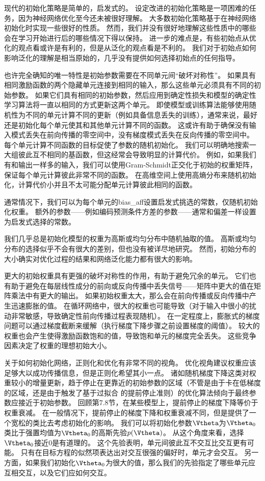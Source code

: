 
现代的初始化策略是简单的，启发式的。
设定改进的初始化策略是一项困难的任务，因为神经网络优化至今还未被很好理解。
大多数初始化策略基于在神经网络初始化时实现一些很好的性质。
然而，我们并没有很好地理解这些性质中的哪些会在学习开始进行后的哪些情况下得以保持。
进一步的难点是，有些初始点从优化的观点看或许是有利的，但是从泛化的观点看是不利的。
我们对于初始点如何影响泛化的理解是相当原始的，几乎没有提供如何选择初始点的任何指导。

也许完全确知的唯一特性是初始参数需要在不同单元间“破坏对称性”。
如果具有相同激励函数的两个隐藏单元连接到相同的输入，那么这些单元必须具有不同的初始参数。
如果它们具有相同的初始参数，然后应用到确定性损失和模型的确定性学习算法将一直以相同的方式更新这两个单元。
即使模型或训练算法能够使用随机性为不同的单元计算不同的更新（例如具备信息丢失的训练），通常来说，最好还是初始化每个单元使其和其他单元计算不同的函数。
这或许有助于确保没有输入模式丢失在前向传播的零空间中，没有梯度模式丢失在反向传播的零空间中。
每个单元计算不同函数的目标促使了参数的随机初始化。
我们可以明确地搜索一大组彼此互不相同的基函数，但这经常会导致明显的计算代价。  
例如，如果我们有和输出一样多的输入，我们可以使用Gram-Schmidt正交化于初始的权重矩阵，保证每个单元计算彼此非常不同的函数。
在高维空间上使用高熵分布来随机初始化，计算代价小并且不太可能分配单元计算彼此相同的函数。

通常情况下，我们可以为每个单元的\gls{bias_aff}设置启发式挑选的常数，仅随机初始化权重。
额外的参数——例如编码预测条件方差的参数——通常和偏差一样设置为启发式选择的常数。

我们几乎总是初始化模型的权重为高斯或均匀分布中随机抽取的值。
高斯或均匀分布的选择似乎不会有很大的差别，但也没有被详尽地研究。
然而，初始分布的大小确实对优化过程的结果和网络泛化能力都有很大的影响。


更大的初始权重具有更强的破坏对称性的作用，有助于避免冗余的单元。
它们也有助于避免在每层线性成分的前向或反向传播中丢失信号——矩阵中更大的值在矩阵乘法中有更大的输出。
如果初始权重太大，那么会在前向传播或反向传播中产生迅速膨胀的值。
在循环网络中，很大的权重也可能导致（对于输入中很小的扰动非常敏感，导致确定性前向传播过程表现随机）。
在一定程度上，膨胀式的梯度问题可以通过梯度截断来缓解（执行梯度下降步骤之前设置梯度的阈值）。
较大的权重也会产生使得激励函数饱和的值，导致饱和单元的梯度完全丢失。
这些竞争因素决定了权重的理想初始大小。

关于如何初始化网络，正则化和优化有非常不同的视角。
优化视角建议权重应该足够大以成功传播信息，但是正则化希望其小一点。
诸如随机梯度下降这类对权重较小的增量更新，趋于停止在更靠近的初始参数的区域（不管是由于卡在低梯度的区域，还是由于触发了基于过拟合 的提前停止准则）的优化算法倾向于最终参数应接近于初始参数。
回顾第7.8节，在某些模型上，提前停止的梯度下降等价于权重衰减。
在一般情况下，提前停止的梯度下降和权重衰减不同，但是提供了一个宽松的类比去考虑初始化的影响。
我们可以将初始化参数$\Vtheta$为$\Vtheta_0$类比于强置均值为$\Vtheta_0$的高斯先验$p(\Vtheta)$。
从这个角度来看，选择$\Vtheta_0$接近$0$是有道理的。
这个先验表明，单元间彼此互不交互比交互更有可能。
只有在目标方程的似然项表达出对交互很强的偏好时，单元才会交互。
另一方面，如果我们初始化$\Vtheta_0$为很大的值，那么我们的先验指定了哪些单元应互相交互，以及它们应如何交互。

